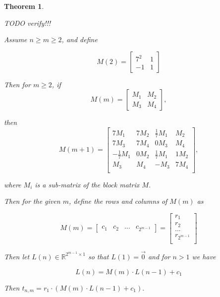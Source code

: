 \documentclass[12pt]{article}
\theoremstyle{plain}
\newtheorem{thm}{Theorem}
\theoremstyle{definition}
\theoremstyle{remark}
\theoremstyle{definition}
\begin{document}
\begin{thm}
\label{thm: messy mosaics 7}

TODO verify!!!

Assume $n \geq m \geq 2$, and define

$$
M(2) = \begin{bmatrix}
7^2 & 1 \\
-1 & 1
\end{bmatrix}
$$

Then for $m \geq 2$, if
$$
M(m) = \begin{bmatrix}
M_1 & M_2 \\
M_3 & M_4
\end{bmatrix},
$$

then
$$
M(m+1) = \begin{bmatrix}
7M_1 & 7M_2 & \frac{1}{7}M_1 & M_2 \\
7M_3 & 7M_4 & 0M_3 & M_4 \\
-\frac{1}{7}M_1 & 0M_2 & \frac{1}{7}M_1 & 1M_2 \\
M_3 & M_4 & -M_3 & 7M_4 \\
\end{bmatrix},
$$

where $M_i$ is a sub-matrix of the block matrix $M$.

Then for the given $m$, define the rows and columns of $M(m)$ as

$$
M(m) = 
\begin{bmatrix}
    c_1 & c_2 & ... & c_{2^{m-1}}
\end{bmatrix} = 
\begin{bmatrix}
    r_1 \\
    r_2 \\
    ... \\
    r_{2^{m-1}} \\
\end{bmatrix}
$$

Then let $L(n) \in \mathbb{R}^{2^{m-1} \times 1}$ so that $L(1) = \vec{0}$ and for $n > 1$ we have

$$L(n) = M(m) \cdot L(n-1)+c_1$$

Then $t_{n,m}=r_1 \cdot (M(m) \cdot L(n-1)+c_1).$

\end{thm}
\end{document}
